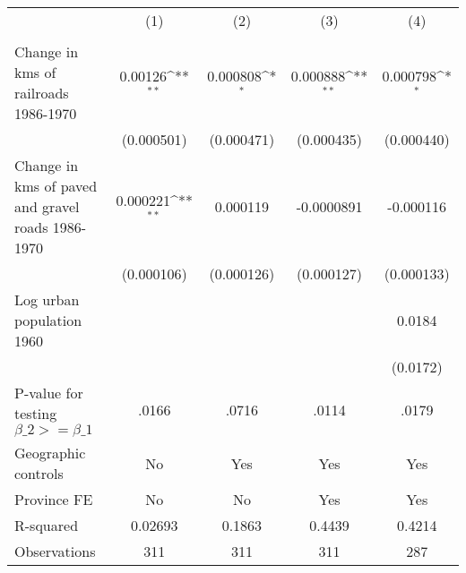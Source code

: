 {
\def\sym#1{\ifmmode^{#1}\else\(^{#1}\)\fi}
\begin{tabular}{l*{4}{c}}
\hline\hline
                &\multicolumn{1}{c}{(1)}&\multicolumn{1}{c}{(2)}&\multicolumn{1}{c}{(3)}&\multicolumn{1}{c}{(4)}\\
                &\multicolumn{1}{c}{}&\multicolumn{1}{c}{}&\multicolumn{1}{c}{}&\multicolumn{1}{c}{}\\
\hline
Change in kms of railroads 1986-1970&  0.00126\sym{**} & 0.000808\sym{*}  & 0.000888\sym{**} & 0.000798\sym{*}  \\
                &(0.000501)         &(0.000471)         &(0.000435)         &(0.000440)         \\
[1em]
Change in kms of paved and gravel roads 1986-1970& 0.000221\sym{**} & 0.000119         &-0.0000891         &-0.000116         \\
                &(0.000106)         &(0.000126)         &(0.000127)         &(0.000133)         \\
[1em]
Log urban population 1960&                  &                  &                  &   0.0184         \\
                &                  &                  &                  & (0.0172)         \\
\hline
P-value for testing $\beta\_{2} >= \beta\_{1}$&    .0166         &    .0716         &    .0114         &    .0179         \\
Geographic controls&       No         &      Yes         &      Yes         &      Yes         \\
Province FE     &       No         &       No         &      Yes         &      Yes         \\
R-squared       &  0.02693         &   0.1863         &   0.4439         &   0.4214         \\
Observations    &      311         &      311         &      311         &      287         \\
\hline\hline
\end{tabular}
}
